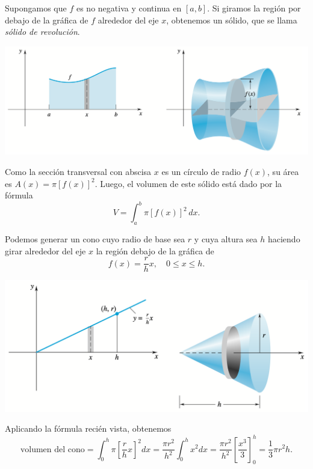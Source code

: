 Supongamos que $f$ es no negativa y continua en $[a, b]$. Si giramos la región por debajo de la gráfica de $f$ alrededor del eje $x$, obtenemos un sólido, que se llama \emph{sólido de revolución}.

\begin{center}
  \includegraphics[width=.8\textwidth]{pics/solido-de-revolucion.png}
\end{center}

Como la sección transversal con abscisa $x$ es un círculo de radio $f(x)$, su área es $A(x) = \pi [f(x)]^2$.
Luego, el volumen de este sólido está dado por la fórmula
\begin{equation}
V = \int_a^b \pi [f(x)]^2 \, dx.
\label{eq:volumen_solido_revolucion}
\end{equation}

\begin{example}
  Podemos generar un cono cuyo radio de base sea $r$ y cuya altura sea $h$ haciendo girar alrededor del eje $x$ la región debajo de la gráfica de 
$$f(x) = \frac{r}{h}x, \quad 0 \leq x \leq h.$$

\begin{center}
  \includegraphics[width=.8\textwidth]{pics/cono-de-revolucion.png}
\end{center}

Aplicando la fórmula recién vista, obtenemos
\[
\text{volumen del cono} = \int_0^h \pi \left[\frac{r}{h}x\right]^2 dx = \frac{\pi r^2}{h^2} \int_0^h x^2 dx
= \frac{\pi r^2}{h^2} \left[\frac{x^3}{3}\right]_0^h = \frac{1}{3}\pi r^2 h.
\]
\end{example}

